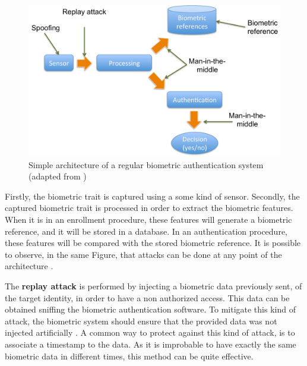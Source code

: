 \begin{figure}[!htb]
\begin{center}
\includegraphics [width=14cm] {images/diagram_attacks.pdf}
\caption[]{Simple architecture of a regular biometric authentication system (adapted from \cite{xiao2005security})} \label{fig:diagram_attacks}
\end{center}
\end{figure}

Firstly, the biometric trait is captured using a some kind of sensor. Secondly, the captured biometric trait is processed in order to extract the biometric features. When it is in an enrollment procedure, these features will generate a biometric reference, and it will be stored in a database. In an authentication procedure, these features will be compared with the stored biometric reference. It is possible to observe, in the same Figure, that attacks can be done at any point of the architecture \cite{xiao2005security}. 


The \textbf{replay attack} is performed by injecting a biometric data previously sent, of the target identity, in order to have a non authorized access. This data can be obtained sniffing the biometric authentication software. To mitigate this kind of attack, the biometric system should ensure that the provided data was not injected artificially \cite{xiao2005security}. A common way to protect against this kind of attack, is to associate a timestamp to the data. As it is improbable to have exactly the same biometric data in different times, this method can be quite effective.

